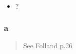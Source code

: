 \begin{solution}

\hfill

\begin{concept}

\hfill

\begin{itemize}
\tightlist
\item
  ?
\end{itemize}

\end{concept}

\hypertarget{a-3}{%
\subsubsection{a}\label{a-3}}

\begin{quote}
See Folland p.26
\end{quote}


\end{solution}
